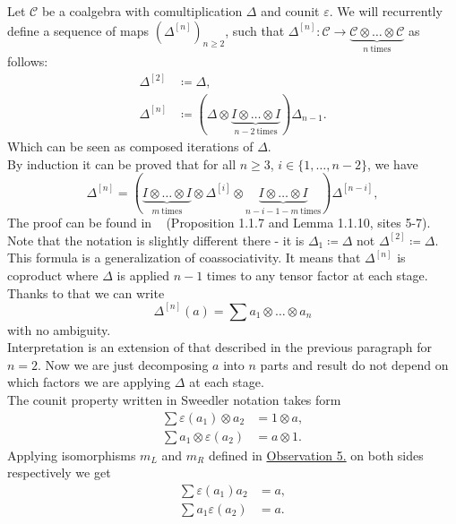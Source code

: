 \documentclass[a4paper, 12pt]{article}
\begin{document}
\indent Let $\mathcal{C} $ be a coalgebra with comultiplication $\Delta$ and counit $\varepsilon$.
We will recurrently define a sequence of maps $(\Delta^{[n]})_{n \geq 2}$, such that
$\Delta^{[n]} : \mathcal{C}  \to \underbrace{\mathcal{C}  \otimes \dots \otimes
\mathcal{C} }_{n \mathrm{\ times}}$ as follows:
\begin{align*}
\Delta^{[2]} &\coloneqq \Delta, \\
\Delta^{[n]} &\coloneqq (\Delta \otimes
\underbrace{I \otimes \dots \otimes I}_{n - 2 \mathrm{\ times}})\Delta_{n-1}.
\end{align*}
Which can be seen as composed iterations of $\Delta$. \\
By induction it can be proved that for all $n \geq 3$, $i \in \{1, \dots, n-2\}$,
 we have
\begin{equation*}
\Delta^{[n]} = (\underbrace{I \otimes \dots \otimes I}_{m\ \mathrm{times}} \otimes
\Delta^{[i]} \otimes \underbrace{I \otimes \dots \otimes I}_{n-i-1-m \mathrm{\ times}})\Delta^{[n-i]},
\end{equation*}
The proof can be found in ~\cite{DNR} (Proposition 1.1.7 and Lemma 1.1.10, sites 5-7). Note that the
notation is slightly different there - it is $\Delta_1 \coloneqq \Delta$ not $\Delta^{[2]} \coloneqq
 \Delta$. \\
This formula is a generalization of coassociativity. It means that $\Delta^{[n]}$ is coproduct where
$\Delta$ is applied $n-1$ times to any tensor factor at each stage. Thanks to that we can write
\begin{equation*}
\Delta^{[n]}(a) = \sum a_1 \otimes \dots \otimes a_n
\end{equation*}
with no ambiguity. \\
Interpretation is an extension of that described in the previous paragraph for $n = 2$. Now we are just
decomposing $a$ into $n$ parts and result do not depend on which factors we are
applying $\Delta$ at each stage.  \\[8pt]
The counit property written in Sweedler notation takes form
\begin{align*}
\sum\varepsilon(a_1) \otimes a_2 &= 1 \otimes a, \\
\sum a_1 \otimes \varepsilon(a_2) &= a \otimes 1.
\end{align*}
Applying isomorphisms $m_L$ and $m_R$ defined in
\hyperref[observation:5]{Observation 5.} on both sides respectively we get
\begin{align*}
\sum\varepsilon(a_1)a_2 &= a, \\
\sum a_1\varepsilon(a_2) &= a.
\end{align*}
\end{document}
